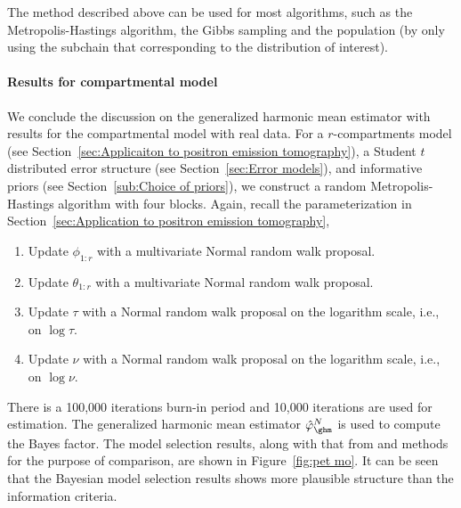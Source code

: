 The method described above can be used for most \mcmc algorithms, such as the
Metropolis-Hastings algorithm, the Gibbs sampling and the population \mcmc (by
only using the subchain that corresponding to the distribution of interest).

\paragraph{Results for \pet compartmental model}

We conclude the discussion on the generalized harmonic mean estimator with
results for the \pet compartmental model with real data. For a
$r$-compartments \pet model (see Section~\ref{sec:Applicaiton to positron
  emission tomography}), a Student $t$ distributed error structure (see
Section~\ref{sec:Error models}), and informative priors (see
Section~\ref{sub:Choice of priors}), we construct a random Metropolis-Hastings
algorithm with four blocks. Again, recall the parameterization in
Section~\ref{sec:Application to positron emission tomography},
\begin{enumerate}
  \item Update $\phi_{1:r}$ with a multivariate Normal random walk proposal.
  \item Update $\theta_{1:r}$ with a multivariate Normal random walk proposal.
  \item Update $\tau$ with a Normal random walk proposal on the logarithm
    scale, i.e., on $\log\tau$.
  \item Update $\nu$ with a Normal random walk proposal on the logarithm
    scale, i.e., on $\log\nu$.
\end{enumerate}
There is a 100,000 iterations burn-in period and 10,000 iterations are used
for estimation. The generalized harmonic mean estimator $\hat\varphi_{\ghm}^N$
is used to compute the Bayes factor. The model selection results, along with
that from \aic and \bic methods for the purpose of comparison, are shown in
Figure~\ref{fig:pet mo}. It can be seen that the Bayesian model selection
results shows more plausible structure than the information criteria.

